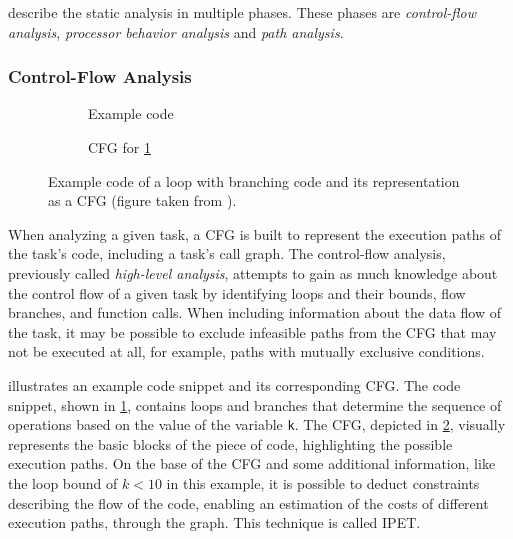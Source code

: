 \textcite{wilhelmWorstcaseExecutiontimeProblem2008} describe the static analysis in multiple phases.
These phases are \textit{control-flow analysis}, \textit{processor behavior analysis} and \textit{path analysis}.

\subsubsection{Control-Flow Analysis}\label{sec:cfa}

\begin{figure}[h]
	\begin{subfigure}[c]{0.45\textwidth}
		
		\caption{Example code}
		\label{fig:cfg_code}
	\end{subfigure}
	\hfill
	\begin{subfigure}[c]{0.45\textwidth}
		
		\caption{\ac{CFG} for \cref{fig:cfg_code}}
		\label{fig:cfg}
	\end{subfigure}
	\caption{Example code of a loop with branching code and its representation as a \ac{CFG} (figure taken from \cite{liCacheModelingRealtime1996}).}
	\label{fig:code_and_cfg}
\end{figure}

When analyzing a given task, a \ac{CFG} is built to represent the execution paths of the task's code, including a task's call graph. The control-flow analysis, previously called \textit{high-level analysis}, attempts to gain as much knowledge about the control flow of a given task by identifying loops and their bounds, flow branches, and function calls. When including information about the data flow of the task, it may be possible to exclude infeasible paths from the \ac{CFG} that may not be executed at all, for example, paths with mutually exclusive conditions.

 illustrates an example code snippet and its corresponding \ac{CFG}.
The code snippet, shown in \cref{fig:cfg_code}, contains loops and branches that determine the sequence of operations based on the value of the variable \texttt{k}.
The \ac{CFG}, depicted in \cref{fig:cfg}, visually represents the basic blocks of the piece of code, highlighting the possible execution paths.
On the base of the \ac{CFG} and some additional information, like the loop bound of $k<10$ in this example, it is possible to deduct constraints describing the flow of the code, enabling an estimation of the costs of different execution paths, through the graph\cite{liCacheModelingRealtime1996,wilhelmWorstcaseExecutiontimeProblem2008}.
This technique is called \ac{IPET}\cite{wilhelmWorstcaseExecutiontimeProblem2008}.

